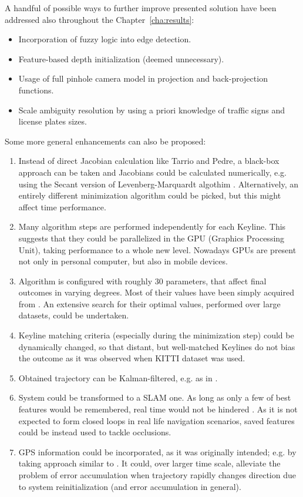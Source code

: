 
A handful of possible ways to further improve presented solution have been addressed also throughout the Chapter~\ref{cha:results}:
\begin{itemize}
	\item Incorporation of fuzzy logic into edge detection.
	\item Feature-based depth initialization (deemed unnecessary).
	\item Usage of full pinhole camera model in projection and back-projection functions.
	\item Scale ambiguity resolution by using a priori knowledge of traffic signs and license plates sizes.
\end{itemize}

Some more general enhancements can also be proposed:
\begin{enumerate}
	\item Instead of direct Jacobian calculation like Tarrio and Pedre, a black-box approach can be taken and Jacobians could be calculated numerically, e.g. using the Secant version of Levenberg-Marquardt algothim \cite{madsen2004methods}. Alternatively, an entirely different minimization algorithm could be picked, but this might affect time performance.
	\item Many algorithm steps are performed independently for each Keyline. This suggests that they could be parallelized in the GPU (Graphics Processing Unit), taking performance to a whole new level. Nowadays GPUs are present not only in personal computer, but also in mobile devices.
	\item Algorithm is configured with roughly 30 parameters, that affect final outcomes in varying degrees. Most of their values have been simply acquired from \cite{jose2015realtime}. An extensive search for their optimal values, performed over large datasets, could be undertaken.
	\item Keyline matching criteria (especially during the minimization step) could be dynamically changed, so that distant, but well-matched Keylines do not bias the outcome as it was observed when KITTI \cite{kitti} dataset was used.
	\item Obtained trajectory can be Kalman-filtered, e.g. as in \cite{min2015visual}.
	\item System could be transformed to a SLAM one. As long as only a few of best features would be remembered, real time would not be hindered \cite{monoslam}. As it is not expected to form closed loops in real life navigation scenarios, saved features could be instead used to tackle occlusions.
	\item GPS information could be incorporated, as it was originally intended; e.g. by taking approach similar to \cite{accurate_global_localization}. It could, over larger time scale, alleviate the problem of error accumulation when trajectory rapidly changes direction due to system reinitialization (and error accumulation in general).
\end{enumerate}


